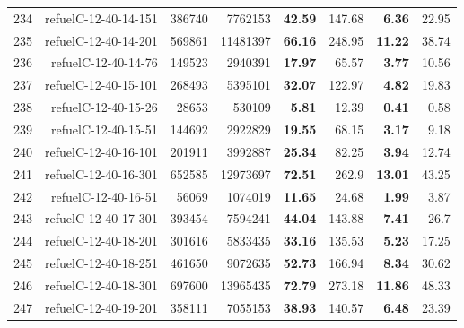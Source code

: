 \begin{longtable}{lrr@{\hskip 12pt}r@{\hskip 12pt}r@{\hskip 12pt}r@{\hskip 12pt}r@{\hskip 12pt}r}
234 & \multirow{1}{*}{refuelC-12-40-14-151} & \multirow{1}{*}{386740} & \multirow{1}{*}{7762153} & \textbf{42.59} & 147.68 & \textbf{6.36} & 22.95 \\
235 & \multirow{1}{*}{refuelC-12-40-14-201} & \multirow{1}{*}{569861} & \multirow{1}{*}{11481397} & \textbf{66.16} & 248.95 & \textbf{11.22} & 38.74 \\
236 & \multirow{1}{*}{refuelC-12-40-14-76} & \multirow{1}{*}{149523} & \multirow{1}{*}{2940391} & \textbf{17.97} & 65.57 & \textbf{3.77} & 10.56 \\
237 & \multirow{1}{*}{refuelC-12-40-15-101} & \multirow{1}{*}{268493} & \multirow{1}{*}{5395101} & \textbf{32.07} & 122.97 & \textbf{4.82} & 19.83 \\
238 & \multirow{1}{*}{refuelC-12-40-15-26} & \multirow{1}{*}{28653} & \multirow{1}{*}{530109} & \textbf{5.81} & 12.39 & \textbf{0.41} & 0.58 \\
239 & \multirow{1}{*}{refuelC-12-40-15-51} & \multirow{1}{*}{144692} & \multirow{1}{*}{2922829} & \textbf{19.55} & 68.15 & \textbf{3.17} & 9.18 \\
240 & \multirow{1}{*}{refuelC-12-40-16-101} & \multirow{1}{*}{201911} & \multirow{1}{*}{3992887} & \textbf{25.34} & 82.25 & \textbf{3.94} & 12.74 \\
241 & \multirow{1}{*}{refuelC-12-40-16-301} & \multirow{1}{*}{652585} & \multirow{1}{*}{12973697} & \textbf{72.51} & 262.9 & \textbf{13.01} & 43.25 \\
242 & \multirow{1}{*}{refuelC-12-40-16-51} & \multirow{1}{*}{56069} & \multirow{1}{*}{1074019} & \textbf{11.65} & 24.68 & \textbf{1.99} & 3.87 \\
243 & \multirow{1}{*}{refuelC-12-40-17-301} & \multirow{1}{*}{393454} & \multirow{1}{*}{7594241} & \textbf{44.04} & 143.88 & \textbf{7.41} & 26.7 \\
244 & \multirow{1}{*}{refuelC-12-40-18-201} & \multirow{1}{*}{301616} & \multirow{1}{*}{5833435} & \textbf{33.16} & 135.53 & \textbf{5.23} & 17.25 \\
245 & \multirow{1}{*}{refuelC-12-40-18-251} & \multirow{1}{*}{461650} & \multirow{1}{*}{9072635} & \textbf{52.73} & 166.94 & \textbf{8.34} & 30.62 \\
246 & \multirow{1}{*}{refuelC-12-40-18-301} & \multirow{1}{*}{697600} & \multirow{1}{*}{13965435} & \textbf{72.79} & 273.18 & \textbf{11.86} & 48.33 \\
247 & \multirow{1}{*}{refuelC-12-40-19-201} & \multirow{1}{*}{358111} & \multirow{1}{*}{7055153} & \textbf{38.93} & 140.57 & \textbf{6.48} & 23.39 \\

\end{longtable}
